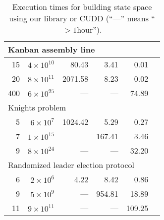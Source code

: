 \documentclass[a4paper]{easychair}
\begin{document}
{\begin{table}[htb]
\begin{center}
{\begin{tabular}{|r||r||r|r|r|r|}
      \hline
      \multicolumn{5}{|l|}{Kanban assembly line}\\
      \hline
      15 & $4\times10^{10}$ &   80.43 &    3.41 &    0.01 \\
      20 & $8\times10^{11}$ & 2071.58 &    8.23 &    0.02 \\
      400 & $6\times10^{25}$ &   --- &   --- &   74.89 \\
      \hline
      \multicolumn{5}{|l|}{Knights problem}\\
      \hline
      5 & $6\times10^{7}$ & 1024.42 &    5.29 &    0.27 \\
      7 & $1\times10^{15}$ &   --- &  167.41 &    3.46 \\
      9 & $8\times10^{24}$ &   --- &   --- &   32.20 \\
      \hline
      \multicolumn{5}{|l|}{Randomized leader election protocol}\\
      \hline
      6 & $2\times10^{6}$ &   4.22 &    8.42 &    0.86 \\
      9 & $5\times10^{9}$ &   --- &  954.81 &   18.89 \\
      11 & $9\times10^{11}$ &   --- &   --- &  109.25 \\
      \hline
    \end{tabular}}
    \caption{Execution times for building state space using our library or CUDD (``---'' means ``$>1$hour'').}
    \label{table-results}
  \end{center}
\end{table}
}
\vspace*{-5mm}
\end{document}
